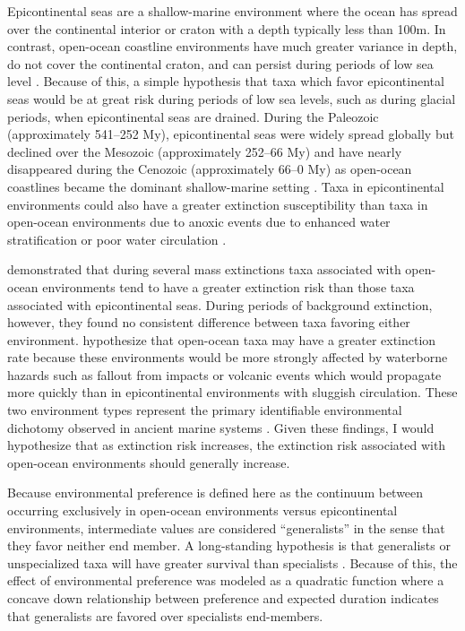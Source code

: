 \documentclass[11pt]{article}
\begin{document}
Epicontinental seas are a shallow-marine environment where the ocean has spread over the continental interior or craton with a depth typically less than 100m. In contrast, open-ocean coastline environments have much greater variance in depth, do not cover the continental craton, and can persist during periods of low sea level \citep{Miller2009a}. Because of this, a simple hypothesis that taxa which favor epicontinental seas would be at great risk during periods of low sea levels, such as during glacial periods, when epicontinental seas are drained. During the Paleozoic (approximately 541--252 My), epicontinental seas were widely spread globally but declined over the Mesozoic (approximately 252--66 My) and have nearly disappeared during the Cenozoic (approximately 66--0 My) as open-ocean coastlines became the dominant shallow-marine setting \citep{Sheehan2001b,Peters2008,Miller2009a,Johnson1974}. Taxa in epicontinental environments could also have a greater extinction susceptibility than taxa in open-ocean environments due to anoxic events due to enhanced water stratification or poor water circulation \citep{Peters2007}.

\citet{Miller2009a} demonstrated that during several mass extinctions taxa associated with open-ocean environments tend to have a greater extinction risk than those taxa associated with epicontinental seas. During periods of background extinction, however, they found no consistent difference between taxa favoring either environment. \citet{Miller2009a} hypothesize that open-ocean taxa may have a greater extinction rate because these environments would be more strongly affected by waterborne hazards such as fallout from impacts or volcanic events which would propagate more quickly than in epicontinental environments with sluggish circulation. These two environment types represent the primary identifiable environmental dichotomy observed in ancient marine systems \citep{Miller2009a,Sheehan2001b}. Given these findings, I would hypothesize that as extinction risk increases, the extinction risk associated with open-ocean environments should generally increase. 

Because environmental preference is defined here as the continuum between occurring exclusively in open-ocean environments versus epicontinental environments, intermediate values are considered ``generalists'' in the sense that they favor neither end member. A long-standing hypothesis is that generalists or unspecialized taxa will have greater survival than specialists \citep{Simpson1944,Liow2004a,Liow2007b,Nurnberg2013a,Nurnberg2015,Baumiller1993,Smits2015}. Because of this, the effect of environmental preference was modeled as a quadratic function where a concave down relationship between preference and expected duration indicates that generalists are favored over specialists end-members.
\end{document}
